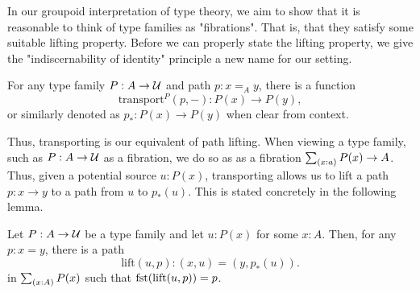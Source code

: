 \documentclass[main.tex]{subfiles}
\begin{document}
In our groupoid interpretation of type theory, we aim to show that it is reasonable to think of type families as "fibrations".
That is, that they satisfy some suitable lifting property. Before we can properly state the lifting property, we give the "indiscernability of identity" principle 
a new name for our setting.
\begin{lemma}
    For any type family $P : A \to \mathcal{U}$ and path $p : x =_A y$, there is a function 
    \[\text{transport}^P(p, -) : P(x) \to P(y),\]
    or similarly denoted as $p_* : P(x) \to P(y)$ when clear from context.
\end{lemma}
Thus, transporting is our equivalent of path lifting. When viewing a type family, such as $P : A \to \mathcal{U}$ as a fibration, we do so as
as a fibration $\sm{x : a}P(x) \to A$. Thus, given a potential source $u : P(x)$, transporting allows us to lift a path $p : x \to y$
to a path from $u$ to $p_*(u)$. This is stated concretely in the following lemma.
\begin{lemma}
    Let $P : A \to \mathcal{U}$ be a type family and let $u : P(x)$ for some $x : A$. Then, for any $p : x = y$, there is a path
    $$\text{lift}(u,p) : (x,u) = (y, p_*(u)).$$
    in $\sm{x : A}P(x)$ such that $\text{fst}(\text{lift}(u,p)) = p$.
\end{lemma}
\end{document}
